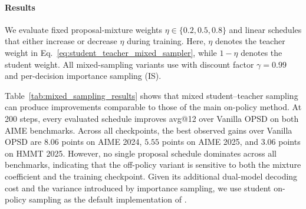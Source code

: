 \paragraph{Results}
We evaluate fixed proposal-mixture weights
$\eta\in\{0.2,0.5,0.8\}$ and linear schedules that either increase or decrease $\eta$
during training. Here, $\eta$ denotes the teacher weight in
Eq.~\ref{eq:student_teacher_mixed_sampler}, while $1-\eta$ denotes the student weight.
All mixed-sampling variants use \ours{} with discount factor $\gamma=0.99$ and
per-decision importance sampling (IS).



Table~\ref{tab:mixed_sampling_results} shows that mixed student--teacher sampling can
produce improvements comparable to those of the main on-policy \ours{} method. At 200
steps, every evaluated schedule improves avg@12 over Vanilla OPSD on both AIME
benchmarks. Across all checkpoints, the best observed gains over Vanilla OPSD are $8.06$
points on AIME 2024, $5.55$ points on AIME 2025, and $3.06$ points on HMMT 2025.
However, no single proposal schedule dominates across all benchmarks, indicating that the
off-policy variant is sensitive to both the mixture coefficient and the training checkpoint.
Given its additional dual-model decoding cost and the variance introduced by importance
sampling, we use student on-policy sampling as the default implementation of \ours{}.